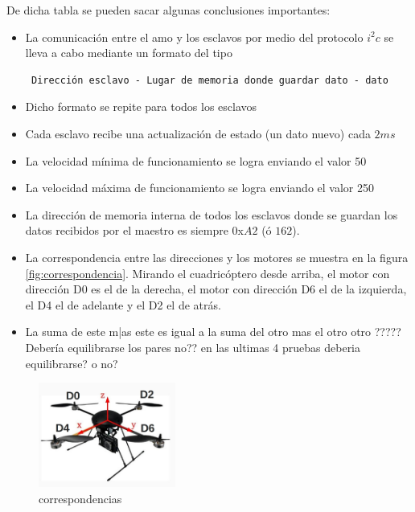 \documentclass[spanish,12pt,a4paper,titlepage]{report}
\begin{document}
De dicha tabla se pueden sacar algunas conclusiones importantes:
\begin{itemize}
\item La comunicación entre el amo y los esclavos por medio del protocolo $i^2c$ se lleva a cabo mediante un  formato del tipo \begin{verbatim} Dirección esclavo - Lugar de memoria donde guardar dato - dato \end{verbatim}
\item Dicho formato se repite para todos los esclavos
\item Cada esclavo recibe una actualización de estado (un dato nuevo) cada $2 ms$
\item La velocidad mínima de funcionamiento se logra enviando el valor 50
\item La velocidad máxima de funcionamiento se logra enviando el valor 250
\item La dirección de memoria interna de todos los esclavos donde se guardan los datos recibidos por el maestro es siempre 0x$A2$ (ó $162$).
\item La correspondencia entre las direcciones y los motores se muestra en la figura \ref{fig:correspondencia}. Mirando el cuadricóptero desde arriba, el motor con dirección D0 es el de la derecha, el motor con dirección D6 el de la izquierda, el D4 el de adelante y el D2 el de atrás.
\item La suma de este m|as este es igual a la suma del otro mas el otro otro ????? Debería equilibrarse los pares no?? en las ultimas 4 pruebas deberia equilibrarse? o no?
\end{itemize}

\begin{figure}[h!]
	\centering
	\includegraphics[width=0.4\textwidth]{./pics/correspondencias.jpg}
	\caption{correspondencias}
	\label{fig:correspondencias}
\end{figure}
\end{document}
